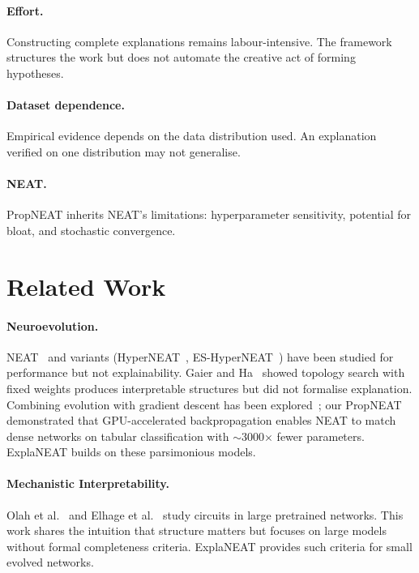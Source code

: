\documentclass[11pt]{article}
\begin{document}
\paragraph{Effort.} Constructing complete explanations remains labour-intensive. The framework structures the work but does not automate the creative act of forming hypotheses.

\paragraph{Dataset dependence.} Empirical evidence depends on the data distribution used. An explanation verified on one distribution may not generalise.

\paragraph{NEAT.} PropNEAT inherits NEAT's limitations: hyperparameter sensitivity, potential for bloat, and stochastic convergence.


\section{Related Work}
\label{sec:related}

\paragraph{Neuroevolution.} NEAT~\cite{stanley2002evolving} and variants (HyperNEAT~\cite{stanley2009hypercube}, ES-HyperNEAT~\cite{risi2012enhanced}) have been studied for performance but not explainability. Gaier and Ha~\cite{gaier2019weight} showed topology search with fixed weights produces interpretable structures but did not formalise explanation. Combining evolution with gradient descent has been explored~\cite{morse2016simple,lyu2021efficient}; our PropNEAT~\cite{merry2025propneat} demonstrated that GPU-accelerated backpropagation enables NEAT to match dense networks on tabular classification with $\sim$3000$\times$ fewer parameters. ExplaNEAT builds on these parsimonious models.

\paragraph{Mechanistic Interpretability.} Olah et al.~\cite{olah2020zoom} and Elhage et al.~\cite{elhage2021mathematical} study circuits in large pretrained networks. This work shares the intuition that structure matters but focuses on large models without formal completeness criteria. ExplaNEAT provides such criteria for small evolved networks.
\end{document}
